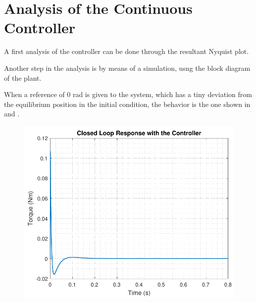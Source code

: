 \section{Analysis of the Continuous Controller}\label{analysisController}
A first analysis of the controller can be done through the resultant Nyquist plot.


Another step in the analysis is by means of a simulation, usng the block diagram of the plant.


When a reference of 0 rad is given to the system, which has a tiny deviation from the equilibrium position in the initial condition, the behavior is the one shown in  and .

\begin{minipage}{\linewidth}
	\begin{minipage}{0.45\linewidth}
		\begin{figure}[H]
			\includegraphics[scale=.56]{figures/TorqueResponse}
			\centering
			\captionsetup{justification=centering}
			\label{TorqueResponse}
		\end{figure}
	\end{minipage}
	\hspace{0.03\linewidth}
	\begin{minipage}{0.45\linewidth}
		\begin{figure}[H]

\end{figure}
\end{minipage}
\end{minipage}
